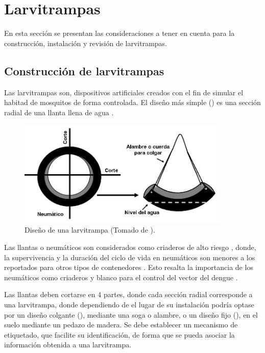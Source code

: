\chapter{Larvitrampas}
En esta sección se presentan las consideraciones a tener en cuenta para la construcción, instalación y revisión de larvitrampas.

\section{Construcción de larvitrampas}
Las larvitrampas son, dispositivos artificiales creados con el fin de simular el habitad de mosquitos de forma controlada. El diseño más simple ()
es una sección radial de una llanta llena de agua \cite{world2009dengue, manualControlArg2009}.

\begin{figure}[!htbp]
\centering
\includegraphics[width=0.9\textwidth]{anexos/graphics/construccion-larvitrampa.png}
\caption{\label{fig:anexo-construccion-larvitrampas} Diseño de una larvitrampa (Tomado de
\cite{manualControlArg2009}).}
\end{figure}

Las llantas o neumáticos son considerados como criaderos de alto riesgo
\cite{bisset2008distribucion, manrique1998desarrollo, ulloa1996abundancia}, donde, la
supervivencia y la  duración del ciclo de vida en neumáticos son menores a los reportados para
otros tipos de contenedores \cite{manrique1998desarrollo}. Esto resalta la importancia de los
neumáticos como criaderos y blanco para el control del vector del dengue
\cite{manrique1998desarrollo, ulloa1996abundancia}.

Las llantas deben cortarse en 4 partes, donde cada sección radial corresponde a una larvitrampa,
donde dependiendo de el lugar de su instalación podría optase por un diseño colgante
(), mediante una soga o alambre, o un diseño fijo
(), en el suelo mediante un pedazo de madera. Se debe establecer un
mecanismo de etiquetado, que facilite su identificación, de forma que se pueda asociar la
información obtenida a una larvitrampa.

